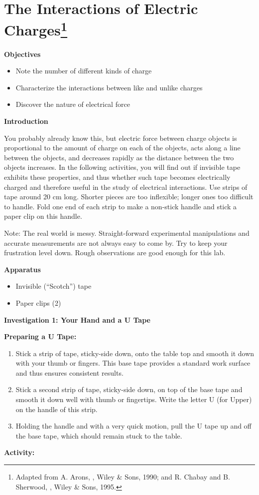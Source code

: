 
\section{The Interactions of Electric Charges\footnote{%
Adapted from A. Arons, ,
Wiley \& Sons, 1990; and R. Chabay and B. Sherwood, , Wiley \& Sons, 1995.
}}

\makelabheader %

\textbf{Objectives}

\begin{itemize}
\item Note the number of different kinds of charge
\item Characterize the interactions between like and unlike charges
\item Discover the nature of electrical force
\end{itemize}
\textbf{Introduction}

You probably already know this, but electric force between charge
objects is proportional to the amount of charge on each of the objects,
acts along a line between the objects, and decreases rapidly as the
distance between the two objects increases. In the following activities,
you will find out if invisible tape exhibits these properties, and
thus whether such tape becomes electrically charged and therefore
useful in the study of electrical interactions. Use strips of tape
around 20 cm long. Shorter pieces are too inflexible; longer ones
too difficult to handle. Fold one end of each strip to make a non-stick
handle and stick a paper clip on this handle.

Note: The real world is messy. Straight-forward experimental manipulations
and accurate measurements are not always easy to come by. Try to keep
your frustration level down. Rough observations are good enough for
this lab.

\textbf{Apparatus}

\begin{itemize}
\item Invisible ({}``Scotch'') tape
\item Paper clips (2)
\end{itemize}
\textbf{Investigation 1: Your Hand and a U Tape}

\textbf{Preparing a U Tape:}

\begin{enumerate}
\item Stick a strip of tape, sticky-side down, onto the table top and smooth
it down with your thumb or fingers. This base tape provides a standard
work surface and thus ensures consistent results.
\item Stick a second strip of tape, sticky-side down, on top of the base
tape and smooth it down well with thumb or fingertips. Write the letter
U (for Upper) on the handle of this strip.
\item Holding the handle and with a very quick motion, pull the U tape up
and off the base tape, which should remain stuck to the table.
\end{enumerate}
\textbf{Activity:}

